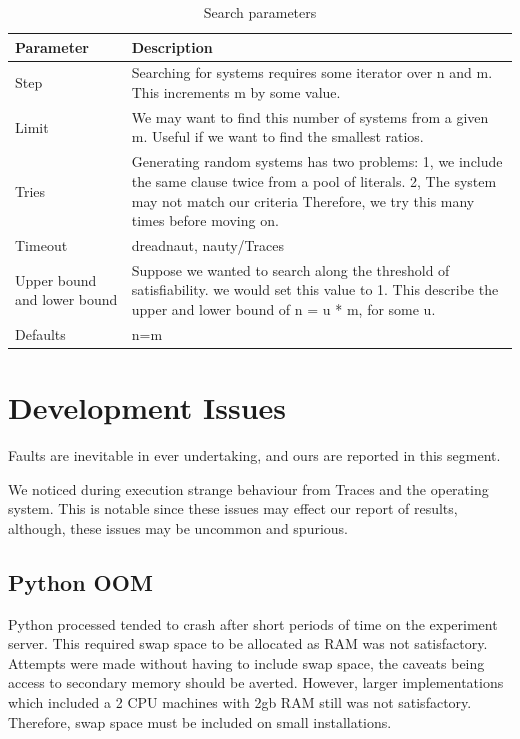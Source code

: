 \begin{table}[h]
	\centering
	\label{tab:parm}
	\begin{tabular}{p{2cm}| p{11cm}}
		\toprule
		Parameter & Description \\
		\midrule
		Step & Searching for systems requires some iterator over n and m. This increments m by some value. \\ \hline
		Limit &  We may want to find this number of systems from a given m. Useful if we want to find the smallest ratios. \\ \hline
		Tries & Generating random systems has two problems: 1, we include the same clause twice from a pool of literals. 2, The system may not match our criteria Therefore, we try this many times before moving on.\\ \hline
		Timeout & dreadnaut, nauty/Traces \\ \hline
		Upper bound and lower bound & Suppose we wanted to search along the threshold of satisfiability. we would set this value to 1. This describe the upper and lower bound of n = u * m, for some u.\\ \hline
		Defaults & n=m \\
		\bottomrule
	\end{tabular}
	\caption{Search parameters}
\end{table}
\newpage
\section{Development Issues}
Faults are inevitable in ever undertaking, and ours are reported in this segment.
\par
We noticed during execution strange behaviour from Traces and the operating system. This is notable  since these issues may effect our report of results, although, these issues may be uncommon and spurious. 

\subsection{Python OOM}
Python processed tended to crash after short periods of time on the experiment server. This required swap space to be allocated as RAM was not satisfactory. Attempts were made without having to include swap space, the caveats being access to secondary memory should be averted. However, larger implementations which included a 2 CPU machines with 2gb RAM still was not satisfactory. Therefore, swap space must be included on small installations. 


